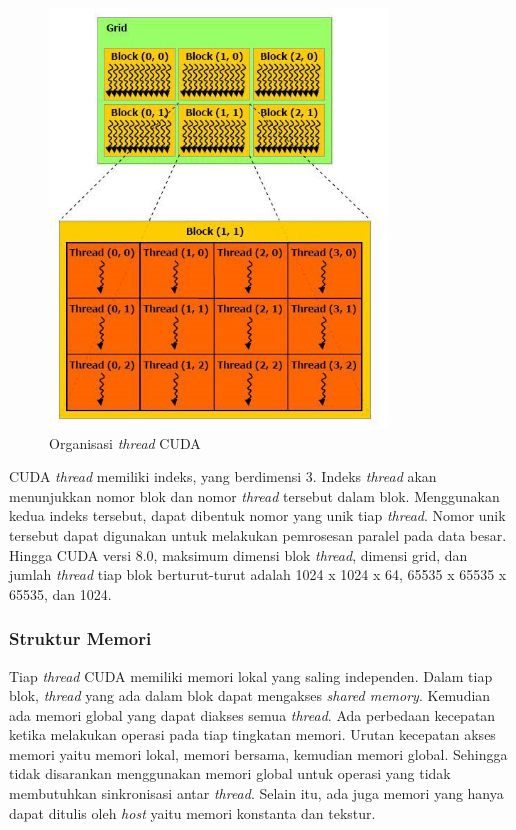       \begin{figure}[H]
        \centering
        \includegraphics[width=0.8\textwidth]{resources/cudathread.jpg}
        \caption{Organisasi \emph{thread} CUDA \parencite{cuda}}
      \end{figure}

      CUDA \emph{thread} memiliki indeks, yang berdimensi 3. Indeks \emph{thread} akan menunjukkan nomor blok dan nomor \emph{thread} tersebut dalam blok. Menggunakan kedua indeks tersebut, dapat dibentuk nomor yang unik tiap \emph{thread}. Nomor unik tersebut dapat digunakan untuk melakukan pemrosesan paralel pada data besar. Hingga CUDA versi 8.0, maksimum dimensi blok \emph{thread}, dimensi grid, dan jumlah \emph{thread} tiap blok berturut-turut adalah 1024 x 1024 x 64, 65535 x 65535 x 65535, dan 1024.

    \subsubsection{Struktur Memori}

      Tiap \emph{thread} CUDA memiliki memori lokal yang saling independen. Dalam tiap blok, \emph{thread} yang ada dalam blok dapat mengakses \emph{shared memory}. Kemudian ada memori global yang dapat diakses semua \emph{thread}. Ada perbedaan kecepatan ketika melakukan operasi pada tiap tingkatan memori. Urutan kecepatan akses memori yaitu memori lokal, memori bersama, kemudian memori global. Sehingga tidak disarankan menggunakan memori global untuk operasi yang tidak membutuhkan sinkronisasi antar \emph{thread}. Selain itu, ada juga memori yang hanya dapat ditulis oleh \emph{host} yaitu memori konstanta dan tekstur.

